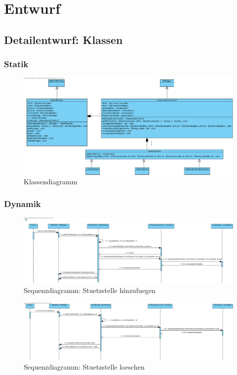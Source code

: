 \chapter{Entwurf}
\label{ch:3}

\section{Detailentwurf: Klassen}
\label{sec:3.1}

\subsection{Statik}
\begin{figure}[!htb]
\centering
\includegraphics[width=\textwidth]{figures/klassendiagramm.eps}
\caption{Klassendiagramm}
\label{fig:Klassendiagramm}
\end{figure}

\subsection{Dynamik}

\begin{figure}
\centering
\includegraphics[width=\textwidth]{figures/sequenzdiagramme/mausklick_links_auf_zeichenflaeche.eps}
\caption{Sequenzdiagramm: Stuetzstelle hinzufuegen}
\end{figure}

\begin{figure}
\centering
\includegraphics[width=\textwidth]{figures/sequenzdiagramme/mausklick_rechts_auf_zeichenflaeche.eps}
\caption{Sequenzdiagramm: Stuetzstelle loeschen}
\end{figure}


